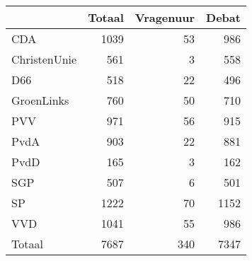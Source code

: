 \begin{tabular}{lrrr}
\toprule
{} &  Totaal &  Vragenuur &  Debat \\
\midrule
CDA          &    1039 &         53 &    986 \\
ChristenUnie &     561 &          3 &    558 \\
D66          &     518 &         22 &    496 \\
GroenLinks   &     760 &         50 &    710 \\
PVV          &     971 &         56 &    915 \\
PvdA         &     903 &         22 &    881 \\
PvdD         &     165 &          3 &    162 \\
SGP          &     507 &          6 &    501 \\
SP           &    1222 &         70 &   1152 \\
VVD          &    1041 &         55 &    986 \\
\midrule
Totaal & 7687 & 340 & 7347 \\
\bottomrule
\end{tabular}
